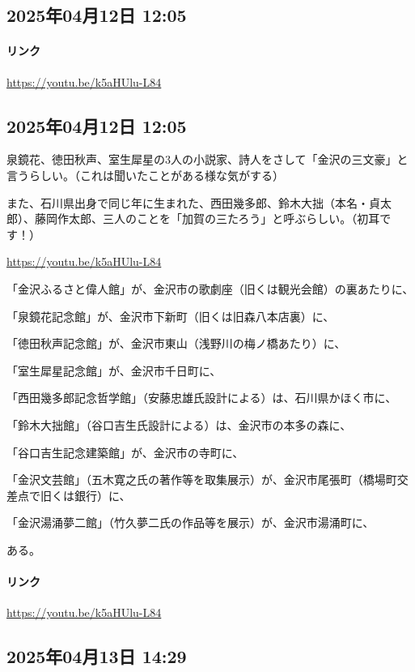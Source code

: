 \subsection*{2025年04月12日 12:05}

\paragraph{リンク}
\url{https://youtu.be/k5aHUlu-L84}

\subsection*{2025年04月12日 12:05}

泉鏡花、徳田秋声、室生犀星の3人の小説家、詩人をさして「金沢の三文豪」と言うらしい。（これは聞いたことがある様な気がする）

また、石川県出身で同じ年に生まれた、西田幾多郎、鈴木大拙（本名・貞太郎）、藤岡作太郎、三人のことを「加賀の三たろう」と呼ぶらしい。（初耳です！）

\url{https://youtu.be/k5aHUlu-L84}

「金沢ふるさと偉人館」が、金沢市の歌劇座（旧くは観光会館）の裏あたりに、

「泉鏡花記念館」が、金沢市下新町（旧くは旧森八本店裏）に、

「徳田秋声記念館」が、金沢市東山（浅野川の梅ノ橋あたり）に、

「室生犀星記念館」が、金沢市千日町に、

「西田幾多郎記念哲学館」（安藤忠雄氏設計による）は、石川県かほく市に、

「鈴木大拙館」（谷口吉生氏設計による）は、金沢市の本多の森に、

「谷口吉生記念建築館」が、金沢市の寺町に、

「金沢文芸館」（五木寛之氏の著作等を取集展示）が、金沢市尾張町（橋場町交差点で旧くは銀行）に、

「金沢湯涌夢二館」（竹久夢二氏の作品等を展示）が、金沢市湯涌町に、

ある。

\paragraph{リンク}
\url{https://youtu.be/k5aHUlu-L84}

\subsection*{2025年04月13日 14:29}

